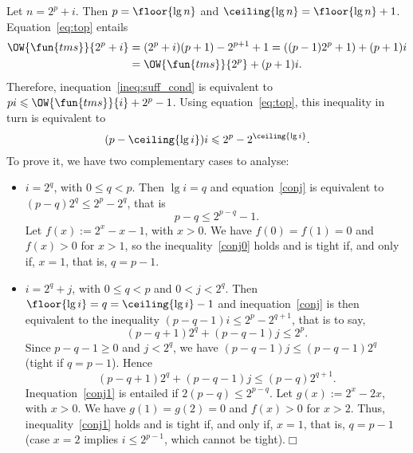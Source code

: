 Let \(n = 2^p + i\). Then \(p = \floor{\lg n}\) and \(\ceiling{\lg n}
= \floor{\lg n} + 1\). Equation~\eqref{eq:top} 
entails
\begin{align*}
\OW{\fun{tms}}{2^p+i} &=
(2^p+i)(p+1)-2^{p+1}+1 = ((p-1)2^p+1)+(p+1)i\\
&= \OW{\fun{tms}}{2^p} + (p+1)i.
\end{align*}
Therefore, inequation~\eqref{ineq:suff_cond} is equivalent to \(pi
\leqslant \OW{\fun{tms}}{i} + 2^p - 1\). Using
equation~\eqref{eq:top}, this inequality in turn is equivalent to
\begin{equation}
(p - \ceiling{\lg i})i \leqslant 2^p - 2^{\ceiling{\lg i}}.
\label{conj}
\end{equation}
To prove it, we have two complementary cases to analyse:
\begin{itemize}

  \item \(i=2^q\), with \(0 \leqslant q < p\). Then \(\lg i = q\) and
  equation~\eqref{conj} is equivalent to \((p-q)2^q \leqslant 2^p -
  2^q\), that is
  \begin{equation}
   p-q \leqslant 2^{p-q} - 1.\label{conj0}
  \end{equation}
  Let \(f(x) := 2^x - x - 1\), with \(x > 0\). We have \(f(0) = f(1) =
  0\) and \(f(x) > 0\) for \(x>1\), so the inequality~\eqref{conj0}
  holds and is tight if, and only if, \(x=1\), that is, \(q=p-1\).

  \item \(i = 2^q + j\), with \(0 \leqslant q < p\) and \(0 < j <
    2^q\). Then \(\floor{\lg i} = q = \ceiling{\lg i} - 1\) and
    inequation~\eqref{conj} is then equivalent to the inequality
    \((p-q-1)i \leqslant 2^p - 2^{q+1}\), that is to say,
    \begin{equation}
      (p-q+1)2^q + (p-q-1)j \leqslant 2^p.\label{conj1}
    \end{equation}
    Since \(p-q-1 \geqslant 0\) and \(j < 2^q\), we have \((p-q-1)j
    \leqslant (p-q-1)2^q\) (tight if \(q=p-1\)). Hence
    \begin{equation*}
      (p-q+1)2^q+(p-q-1)j \leqslant (p-q)2^{q+1}.
    \end{equation*}
    Inequation~\eqref{conj1} is entailed if \(2(p-q)
    \leqslant 2^{p-q}\). Let \(g(x) := 2^x - 2x\), with \(x > 0\). We
    have \(g(1) = g(2) = 0\) and \(f(x) > 0\) for \(x > 2\). Thus,
    inequality~\eqref{conj1} holds and is tight if, and only if,
    \(x=1\), that is, \(q=p-1\) (case \(x=2\) implies \(i
    \leqslant 2^{p-1}\), which cannot be tight).\hfill\(\Box\)

\end{itemize}

